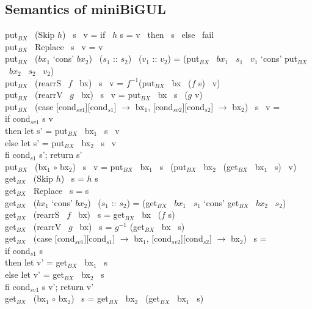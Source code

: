 \documentclass[runningheads]{llncs}
\newcommand{\bxput}[3]{put$_{BX}$ \ {#1} \ {#2} \ {#3}}
\newcommand{\bxget}[2]{get$_{BX}$ \ {#1} \ {#2}}
\newcommand{\sif}[3]{if \ {#1} \ then \ {#2} \ else \ {#3}}
\newcommand{\product}[2]{({#1} `cons' {#2})}
\newcommand{\tuple}[2]{(#1 :: #2)}
\newcommand{\rearrS}[2]{rearrS \ #1 \ #2}
\newcommand{\rearrV}[2]{rearrV \ #1 \ #2}
\newcommand{\casebx}[6]{case [#1][#2] $\to$ #3, [#4][#5] $\to$ #6}
\begin{document}
\subsection{Semantics of miniBiGUL}

\bxput{(Skip $h$)}{s}{v} = \sif{$h$ s = v}{s}{fail}\\
\bxput{Replace}{s}{v} = v\\
\bxput{\product{$bx_1$}{$bx_2$}}{\tuple{$s_1$}{$s_2$}}{\tuple{$v_1$}{$v_2$}} = \product{\bxput{$bx_1$}{$s_1$}{$v_1$}}{\bxput{$bx_2$}{$s_2$}{$v_2$}}\\
\bxput{(\rearrS{$f$}{bx})}{s}{v} = $f^{-1}$(\bxput{bx}{($f$ s)}{v})\\
\bxput{(\rearrV{$g$}{bx})}{s}{v} = \bxput{bx}{s}{($g$ v)}\\
\bxput{(\casebx{cond$_{sv1}$}{cond$_{s1}$}{bx$_1$}{cond$_{sv2}$}{cond$_{s2}$}{bx$_2$})}
      {s}{v} = \\
      \hspace{10mm} if {cond$_{sv1}$ s v}\\
      \hspace{10mm} then let s' = \bxput{bx$_1$}{s}{v}\\
      \hspace{10mm} else let s' = \bxput{bx$_2$}{s}{v}\\
      \hspace{10mm} fi cond$_{s1}$ s'; return s'\\
\bxput{(bx$_1$ $\circ$ bx$_2$)}{s}{v} = \bxput{bx$_1$}{s}{(\bxput{bx$_2$}{(\bxget{bx$_1$}{s})}{v})}\\

\noindent 
\bxget{(Skip $h$)}{s} = {$h$ s}\\
\bxget{Replace}{s} = s\\
\bxget{\product{$bx_1$}{$bx_2$}}{\tuple{$s_1$}{$s_2$}} =
\product{\bxget{$bx_1$}{$s_1$}}{\bxget{$bx_2$}{$s_2$}}\\
\bxget{(\rearrS{$f$}{bx})}{s} = \bxget{bx}{($f$ s)}\\
\bxget{(\rearrV{$g$}{bx})}{s} = $g^{-1}$ (\bxget{bx}{s})\\
\bxget{(\casebx{cond$_{sv1}$}{cond$_{s1}$}{bx$_1$}{cond$_{sv2}$}{cond$_{s2}$}{bx$_2$})}{s} =\\
      \hspace{10mm} if {cond$_{s1}$ s}\\
      \hspace{10mm} then let v' = \bxget{bx$_1$}{s}\\
      \hspace{10mm} else let v' = \bxget{bx$_2$}{s}\\
      \hspace{10mm} fi {cond$_{sv1}$ s v'}; return v'\\
\bxget{(bx$_1$ $\circ$ bx$_2$)}{s} = \bxget{bx$_2$}{(\bxget{bx$_1$}{s})}\\
\end{document}
